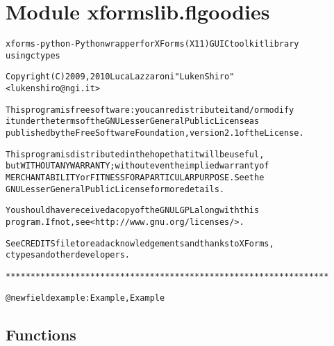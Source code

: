 %
%
%


\section{Module xformslib.flgoodies}

    \label{xformslib:flgoodies}
\begin{alltt}

xforms-python - Python wrapper for XForms (X11) GUI C toolkit library
using ctypes

Copyright (C) 2009, 2010  Luca Lazzaroni "LukenShiro"
    {\textless}lukenshiro@ngi.it{\textgreater}

This program is free software: you can redistribute it and/or modify
it under the terms of the GNU Lesser General Public License as
published by the Free Software Foundation, version 2.1 of the License.

This program is distributed in the hope that it will be useful,
but WITHOUT ANY WARRANTY; without even the implied warranty of
MERCHANTABILITY or FITNESS FOR A PARTICULAR PURPOSE. See the
GNU Lesser General Public License for more details.

You should have received a copy of the GNU LGPL along with this
program. If not, see {\textless}http://www.gnu.org/licenses/{\textgreater}.

See CREDITS file to read acknowledgements and thanks to XForms,
ctypes and other developers.

*****************************************************************


@newfield example: Example, Example
\end{alltt}



  \subsection{Functions}

